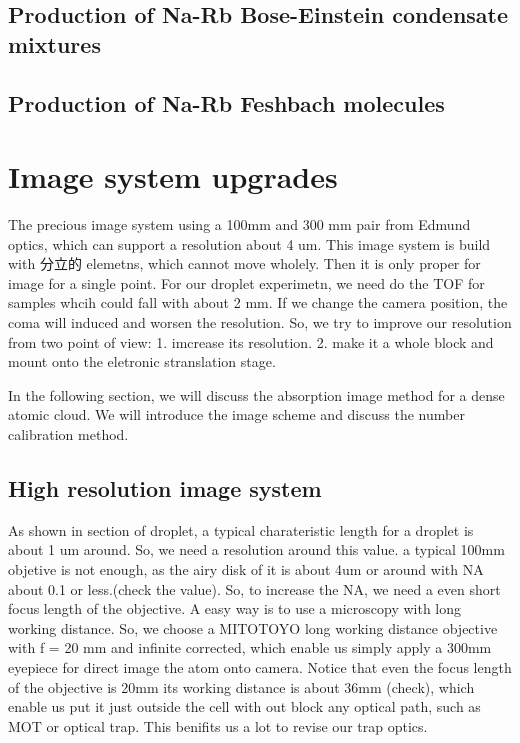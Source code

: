 \subsection{Production of Na-Rb Bose-Einstein condensate mixtures}
\subsection{Production of Na-Rb Feshbach molecules}

\section{Image system upgrades}
The precious image system using a 100mm and 300 mm pair from Edmund optics, which can support a resolution about 4 um. This image system is build with 分立的 elemetns, which cannot move wholely. Then it is only proper for image for a single point. For our droplet experimetn, we need do the TOF for samples whcih could fall with about 2 mm. If we change the camera position, the coma will induced and worsen the resolution. So, we try to improve our resolution from two point of view: 1. imcrease its resolution. 2. make it a whole block and mount onto the eletronic stranslation stage. 

In the following section, we will discuss the absorption image method for a dense atomic cloud. We will introduce the image scheme and discuss the number calibration method.

\subsection{High resolution image system}
As shown in section of droplet, a typical charateristic length for a droplet is about 1 um around. So, we need a resolution around this value. a typical 100mm objetive is not enough, as the airy disk of it is about 4um or around with NA about 0.1 or less.(check the value). So, to increase the NA, we need a even short focus length of the objective. A easy way is to use a microscopy with long working distance. So, we choose a MITOTOYO long working distance objective with f = 20 mm and infinite corrected, which enable us simply apply a 300mm eyepiece for direct image the atom onto camera. Notice that even the focus length of the objective is 20mm its working distance is about 36mm (check), which enable us put it just outside the cell with out block any optical path, such as MOT or optical trap. This benifits us a lot to revise our trap optics.

